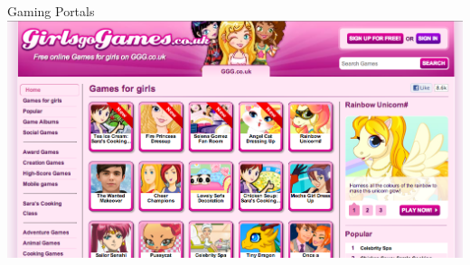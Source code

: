 \documentclass[aspectratio=169]{beamer}
\begin{document}
\begin{frame}{Gaming Portals}
    \includegraphics[width=\textwidth]{images/ggg.png}
\end{frame}
\end{document}
